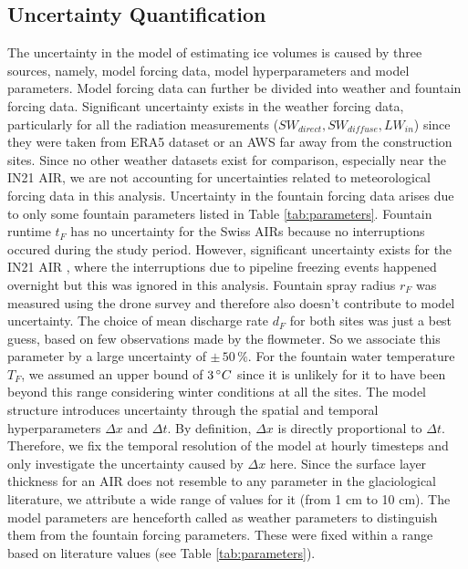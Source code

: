 \documentclass[utf8]{frontiersSCNS}
\begin{document}
\subsection{Uncertainty Quantification}

The uncertainty in the model of estimating ice volumes is caused by three sources, namely, model forcing
data, model hyperparameters and model parameters. Model forcing data can further be divided into weather and
fountain forcing data. Significant uncertainty exists in the weather forcing data, particularly for all the
radiation measurements ($SW_{direct}, SW_{diffuse}, LW_{in}$) since they were taken from ERA5 dataset or an AWS
far away from the construction sites. Since no other weather datasets exist for comparison, especially near the
IN21 AIR, we are not accounting for uncertainties related to meteorological forcing data in this analysis.
Uncertainty in the fountain forcing data arises due to only some fountain parameters listed in Table
\ref{tab:parameters}. Fountain runtime $t_F$ has no uncertainty for the Swiss AIRs because no interruptions
occured during the study period. However, significant uncertainty exists for the IN21 AIR , where the
interruptions due to pipeline freezing events happened overnight but this was ignored in this analysis. Fountain
spray radius $r_F$ was measured using the drone survey and therefore also doesn't contribute to model
uncertainty. The choice of mean discharge rate $d_F$ for both sites was just a best guess, based on few observations made by the
flowmeter. So we associate this parameter by a large uncertainty of $\pm \,50\, \%$. For the fountain water
temperature $T_F$, we assumed an upper bound of $3\, \degree C$ since it is unlikely for it to have been beyond
this range considering winter conditions at all the sites. The model structure introduces uncertainty through
the spatial and temporal hyperparameters $\Delta x$ and $\Delta t$. By definition, $\Delta x$ is directly
proportional to $\Delta t$. Therefore, we fix the temporal resolution of the model at hourly timesteps and only
investigate the uncertainty caused by $\Delta x$ here. Since the surface layer thickness for an AIR does not
resemble to any parameter in the glaciological literature, we attribute a wide range of values for it (from 1 cm
to 10 cm). The model parameters are henceforth called as weather parameters to distinguish them from the
fountain forcing parameters. These were fixed within a range based on literature values (see Table
\ref{tab:parameters}). 
\end{document}
